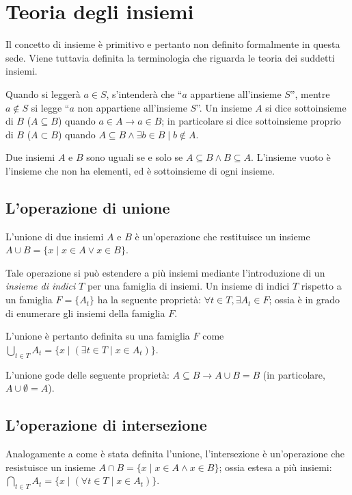 \chapter{Teoria degli insiemi}

Il concetto di insieme è primitivo e pertanto non definito formalmente
in questa sede. Viene tuttavia definita la terminologia che riguarda
le teoria dei suddetti insiemi.

Quando si leggerà $a \in S$, s'intenderà che ``$a$ appartiene all'insieme $S$'', mentre
$a \notin S$ si legge ``$a$ non appartiene all'insieme $S$''. Un insieme $A$ si dice
sottoinsieme di $B$ ($A \subseteq B$) quando $a \in A \rightarrow a \in B$; in particolare
si dice sottoinsieme proprio di $B$ ($A \subset B$) quando
$A \subseteq B \land \exists b \in B \mid b \notin A$.

Due insiemi $A$ e $B$ sono uguali se e solo se $A \subseteq B \land B \subseteq A$.
L'insieme vuoto è l'insieme che non ha elementi, ed è sottoinsieme di ogni insieme.

\section{L'operazione di unione}

L'unione di due insiemi $A$ e $B$ è un'operazione che restituisce un insieme
$A \cup B = \{x \mid x \in A \lor x \in B\}$.

Tale operazione si può estendere a più insiemi mediante l'introduzione di
un \textit{insieme di indici} $T$ per una famiglia di insiemi. Un insieme di
indici $T$ rispetto a un famiglia $F=\{A_t\}$ ha la seguente proprietà: $\forall t \in
    T, \exists A_t \in F$; ossia è in grado di enumerare gli insiemi della famiglia $F$.

L'unione è pertanto definita su una famiglia $F$ come $\bigcup_{t \in T} A_t =
    \{x \mid (\exists t \in T \mid x \in A_t)\}$.

L'unione gode delle seguente proprietà: $A \subseteq B \rightarrow A \cup B = B$
(in particolare, $A \cup \emptyset = A$).

\section{L'operazione di intersezione}

Analogamente a come è stata definita l'unione, l'intersezione è un'operazione che
resistuisce un insieme $A \cap B = \{x \mid x \in A \land x \in B\}$; ossia estesa a più
insiemi: $\bigcap_{t \in T} A_t = \{x \mid (\forall t \in T \mid x \in A_t)\}$.


